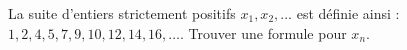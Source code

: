 La suite d'entiers strictement positifs $x_1, x_2, \ldots$ est définie ainsi : $1, 2, 4, 5, 7, 9, 10, 12, 14, 16, \ldots$. Trouver une formule pour $x_n$.

